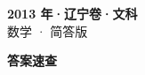 \documentclass[zihao=-4, a4paper]{ctexart}
\begin{document}
\begin{center}
  {\Large\bfseries 2013 年·辽宁卷·文科}\\[4pt]
  {\large 数学 · 简答版}
\end{center}
\medskip
{}

\clearpage
{}
\begin{center}{\Large\bfseries 答案速查}\end{center}
\medskip

\end{document}
